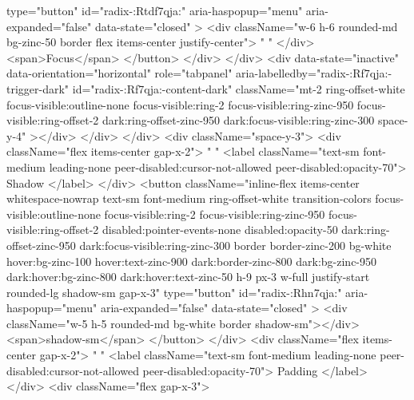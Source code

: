 {                      type="button"
                      id="radix-:Rtdf7qja:"
                      aria-haspopup="menu"
                      aria-expanded="false"
                      data-state="closed"
                    >
                      <div className="w-6 h-6 rounded-md bg-zinc-50 border flex items-center justify-center">
                        {" "}
                      </div>
                      <span>Focus</span>
                    </button>
                  </div>
                </div>
                <div
                  data-state="inactive"
                  data-orientation="horizontal"
                  role="tabpanel"
                  aria-labelledby="radix-:Rf7qja:-trigger-dark"
                  id="radix-:Rf7qja:-content-dark"
                  className="mt-2 ring-offset-white focus-visible:outline-none focus-visible:ring-2 focus-visible:ring-zinc-950 focus-visible:ring-offset-2 dark:ring-offset-zinc-950 dark:focus-visible:ring-zinc-300 space-y-4"
                ></div>
              </div>
            </div>
            <div className="space-y-3">
              <div className="flex items-center gap-x-2">
                {" "}
                <label className="text-sm font-medium leading-none peer-disabled:cursor-not-allowed peer-disabled:opacity-70">
                  Shadow
                </label>
              </div>
              <button
                className="inline-flex items-center whitespace-nowrap text-sm font-medium ring-offset-white transition-colors focus-visible:outline-none focus-visible:ring-2 focus-visible:ring-zinc-950 focus-visible:ring-offset-2 disabled:pointer-events-none disabled:opacity-50 dark:ring-offset-zinc-950 dark:focus-visible:ring-zinc-300 border border-zinc-200 bg-white hover:bg-zinc-100 hover:text-zinc-900 dark:border-zinc-800 dark:bg-zinc-950 dark:hover:bg-zinc-800 dark:hover:text-zinc-50 h-9 px-3 w-full justify-start rounded-lg shadow-sm gap-x-3"
                type="button"
                id="radix-:Rhn7qja:"
                aria-haspopup="menu"
                aria-expanded="false"
                data-state="closed"
              >
                <div className="w-5 h-5 rounded-md bg-white border shadow-sm"></div>
                <span>shadow-sm</span>
              </button>
            </div>
            <div className="flex items-center gap-x-2">
              {" "}
              <label className="text-sm font-medium leading-none peer-disabled:cursor-not-allowed peer-disabled:opacity-70">
                Padding
              </label>
            </div>
            <div className="flex gap-x-3">
}
